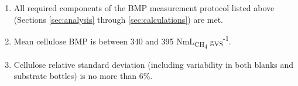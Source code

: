 \documentclass[]{article}
\begin{document}
\begin{enumerate}
  \item All required components of the BMP measurement protocol listed above (Sections \ref{sec:analysis} through \ref{sec:calculations}) are met.
  \item Mean cellulose BMP is between 340 and 395 NmL\textsubscript{CH\textsubscript{4}} g\textsubscript{VS}\textsuperscript{-1}.
  \item Cellulose relative standard deviation (including variability in both blanks and substrate bottles) is no more than 6\%.
\end{enumerate}

{}

\end{document}
